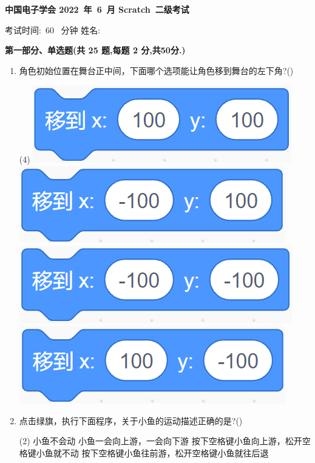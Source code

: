 \documentclass[10pt, a4paper]{article}
\newcommand{\Title}[3]{
    \begin{center}
        \Large \textbf{中国电子学会 #1~年~#2~月 Scratch~#3级考试}
    \end{center}
}
\newcommand{\TimeAndName}[1]{
    \begin{center}
        考试时间:~#1~ 分钟 \qquad\qquad\qquad\qquad 姓名:\underline{\quad\quad\quad\quad}
    \end{center}
}
\begin{document}
    \Title{2022}{6}{二} %
    \TimeAndName{60} %

    \vspace{2mm}
    {\noindent\textbf{第一部分、单选题(共 25 题,每题 2 分,共50分.)}}
    \begin{enumerate}
        \item 角色初始位置在舞台正中间，下面哪个选项能让角色移到舞台的左下角?(\qquad)
        \begin{tasks}(4)
            \task \includegraphics[width=.18\textwidth]{1a.png}
            \task \includegraphics[width=.18\textwidth]{1b.png}
            \task \includegraphics[width=.18\textwidth]{1c.png}
            \task \includegraphics[width=.18\textwidth]{1d.png}
        \end{tasks}

        \item 点击绿旗，执行下面程序，关于小鱼的运动描述正确的是?(\qquad)
        \begin{tasks}(2)
            \task 小鱼不会动
            \task 小鱼一会向上游，一会向下游
            \task 按下空格键小鱼向上游，松开空格键小鱼就不动
            \task 按下空格键小鱼往前游，松开空格键小鱼就往后退
        \end{tasks}


\end{enumerate}
\end{document}

